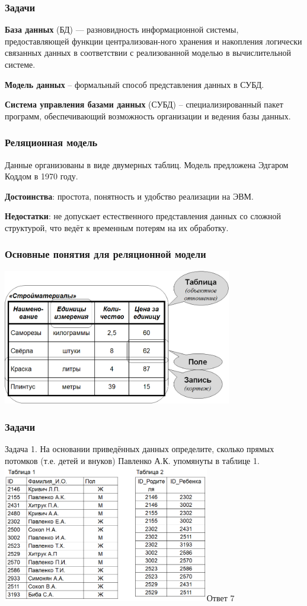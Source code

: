 \begin{frame}[fragile]
\frametitle{Задачи}

\textbf{База данных} (БД) --- разновидность информационной системы, предоставляющей функции централизован-ного  хранения и накопления логически связанных  данных в соответствии с реализованной моделью в вычислительной системе.

\textbf{Модель данных} – формальный способ представления данных в СУБД.

\textbf{Система управления базами данных} (СУБД) – специализированный пакет программ, обеспечивающий возможность организации и ведения базы данных.


\end{frame}

\begin{frame}[fragile]
\frametitle{Реляционная модель}

Данные организованы в виде двумерных таблиц.
Модель предложена Эдгаром Коддом в 1970 году. 

\textbf{Достоинства}: простота, понятность и удобство реализации на ЭВМ.

\textbf{Недостатки}: не допускает естественного представления данных со сложной структурой, что ведёт к временным потерям на их обработку.

\end{frame}

\begin{frame}[fragile]
\frametitle{Основные понятия для реляционной модели}

\includegraphics[width=10cm]{images/it_8}

\end{frame}

\begin{frame}[fragile]
\frametitle{Задачи}
\small
Задача 1. На основании приведённых данных определите, сколько прямых потомков (т.е. детей и внуков) Павленко А.К. упомянуты в таблице 1.\\
\includegraphics[height=6cm]{images/it_9}\pause  Ответ 7
\end{frame}

